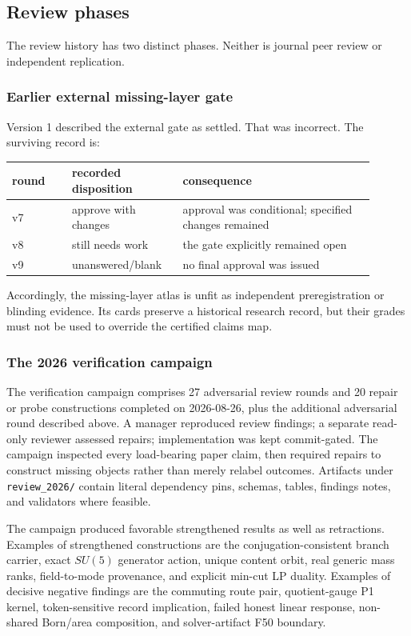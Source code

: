\subsection{Review phases}

The review history has two distinct phases. Neither is journal peer review or independent replication.

\subsubsection{Earlier external missing-layer gate}

Version 1 described the external gate as settled. That was incorrect. The surviving record is:

\begin{longtable}[]{@{}p{0.15\linewidth}p{0.27\linewidth}p{0.48\linewidth}@{}}
\toprule
round & recorded disposition & consequence\\
\midrule
\endhead
v7 & approve with changes & approval was conditional; specified changes remained\\
v8 & still needs work & the gate explicitly remained open\\
v9 & unanswered/blank & no final approval was issued\\
\bottomrule
\end{longtable}

Accordingly, the missing-layer atlas is unfit as independent preregistration or blinding evidence. Its cards preserve a
historical research record, but their grades must not be used to override the certified claims map.

\subsubsection{The 2026 verification campaign}

The verification campaign comprises 27 adversarial review rounds and 20 repair or probe constructions completed on
2026-08-26, plus the additional adversarial round described above. A manager reproduced review findings; a separate
read-only reviewer assessed repairs; implementation was
kept commit-gated. The campaign inspected every load-bearing paper claim, then required repairs to construct missing
objects rather than merely relabel outcomes. Artifacts under \nolinkurl{review_2026/} contain literal dependency pins,
schemas, tables, findings notes, and validators where feasible.

The campaign produced favorable strengthened results as well as retractions. Examples of strengthened constructions are
the conjugation-consistent branch carrier, exact \(SU(5)\) generator action, unique content orbit, real generic mass
ranks, field-to-mode provenance, and explicit min-cut LP duality. Examples of decisive negative findings are the commuting
route pair, quotient-gauge P1 kernel, token-sensitive record implication, failed honest linear response,
non-shared Born/area composition, and solver-artifact F50 boundary.


